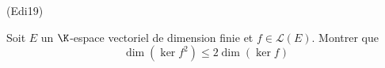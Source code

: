 \begin{tiny}(Edi19)\end{tiny} Soit $E$ un $\K$-espace vectoriel de dimension finie et $f\in \mathcal L(E)$. Montrer que
\begin{displaymath}
 \dim (\ker f^2) \leq 2 \dim (\ker f)
\end{displaymath}

